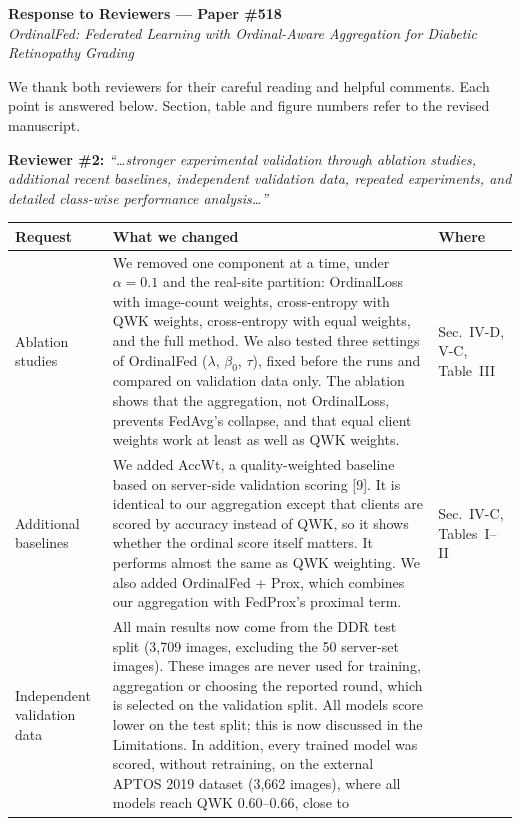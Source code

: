 \documentclass[10pt,a4paper]{article}
\begin{document}
\begin{center}
{\large\bfseries Response to Reviewers --- Paper \#518}\\[2pt]
\textit{OrdinalFed: Federated Learning with Ordinal-Aware Aggregation for Diabetic Retinopathy Grading}
\end{center}

We thank both reviewers for their careful reading and helpful comments. Each
point is answered below. Section, table and figure numbers refer to the revised
manuscript.

\textbf{Reviewer \#2:} \textit{``\ldots stronger experimental validation through
ablation studies, additional recent baselines, independent validation data,
repeated experiments, and detailed class-wise performance analysis\ldots''}

{\small
\begin{tabular}{@{}L{3.1cm}L{11.0cm}L{2.4cm}@{}}
\toprule
\textbf{Request} & \textbf{What we changed} & \textbf{Where} \\
\midrule
Ablation studies &
We removed one component at a time, under $\alpha=0.1$ and the real-site
partition: OrdinalLoss with image-count weights, cross-entropy with QWK weights,
cross-entropy with equal weights, and the full method. We also tested three
settings of OrdinalFed ($\lambda$, $\beta_0$, $\tau$), fixed before the runs and
compared on validation data only. The ablation shows that the aggregation, not
OrdinalLoss, prevents FedAvg's collapse, and that equal client weights work at
least as well as QWK weights. &
Sec.~IV-D, V-C, Table~III \\
Additional baselines &
We added AccWt, a quality-weighted baseline based on server-side validation
scoring [9]. It is identical to our aggregation except that clients are scored by
accuracy instead of QWK, so it shows whether the ordinal score itself matters. It
performs almost the same as QWK weighting. We also added OrdinalFed + Prox, which
combines our aggregation with FedProx's proximal term. &
Sec.~IV-C, Tables~I--II \\
Independent validation data &
All main results now come from the DDR test split (3,709 images, excluding the
50 server-set images). These images are never used for training, aggregation or
choosing the reported round, which is selected on the validation split. All
models score lower on the test split; this is now discussed in the Limitations.
In addition, every trained model was scored, without retraining, on the external
APTOS 2019 dataset (3,662 images), where all models reach QWK 0.60--0.66, close to

\end{tabular}}
\end{document}
